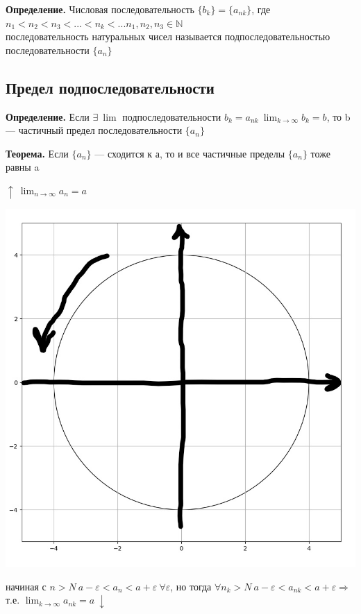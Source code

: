 \documentclass{article}
\begin{document}
    \textbf{Определение.} Числовая последовательность \( \{b_k\} = \{a_{nk}\} \), где \( n_1 < n_2 < n_3 < ... < n_k < ... n_1,n_2,n_3 \in \mathbb{N} \)\\
    последовательность натуральных чисел называется подпоследовательностью последовательности \( \{ a_n \} \)

    \subsection{Предел подпоследовательности}
    
    \textbf{Определение.} Если \(\exists\ \lim\) подпоследовательности \(b_k = a_{nk}\ \lim_{k \rightarrow \infty}{b_k} = b\), то b --- частичный предел последовательности \(\{a_n\}\)

    \textbf{Теорема.} Если \(\{a_n\}\) --- сходится к а, то и все частичные пределы \(\{a_n\}\) тоже равны a

    \(\uparrow\ \lim_{n \rightarrow \infty}{a_n} = a\)

    \begin{center}
        \includegraphics[scale=0.25]{9}
    \end{center}
        
    начиная с \(n > N\ a - \varepsilon < a_n < a + \varepsilon \ \forall \varepsilon\), но тогда \(\forall n_k > N \ a - \varepsilon < a_{nk} < a + \varepsilon \Rightarrow\) т.е. \(\lim_{k \rightarrow \infty}{a_{nk}} = a \ \downarrow\)
\end{document}
